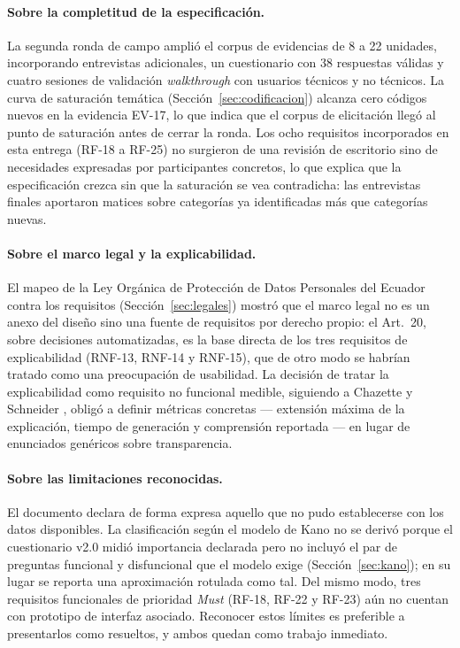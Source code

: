 \documentclass[journal,onecolumn]{IEEEtran}
\begin{document}
	\paragraph{Sobre la completitud de la especificación.}
	La segunda ronda de campo amplió el corpus de evidencias de 8 a 22 unidades,
	incorporando entrevistas adicionales, un cuestionario con 38 respuestas
	válidas y cuatro sesiones de validación \emph{walkthrough} con usuarios
	técnicos y no técnicos. La curva de saturación temática
	(Sección~\ref{sec:codificacion}) alcanza cero códigos nuevos en la evidencia
	EV-17, lo que indica que el corpus de elicitación llegó al punto de
	saturación antes de cerrar la ronda. Los ocho requisitos incorporados en esta
	entrega (RF-18 a RF-25) no surgieron de una revisión de escritorio sino de
	necesidades expresadas por participantes concretos, lo que explica que la
	especificación crezca sin que la saturación se vea contradicha: las
	entrevistas finales aportaron matices sobre categorías ya identificadas más
	que categorías nuevas.
	
	\paragraph{Sobre el marco legal y la explicabilidad.}
	El mapeo de la Ley Orgánica de Protección de Datos Personales del Ecuador
	\cite{lopdp2021} contra los requisitos (Sección~\ref{sec:legales}) mostró que
	el marco legal no es un anexo del diseño sino una fuente de requisitos por
	derecho propio: el Art.~20, sobre decisiones automatizadas, es la base
	directa de los tres requisitos de explicabilidad (RNF-13, RNF-14 y RNF-15),
	que de otro modo se habrían tratado como una preocupación de usabilidad. La
	decisión de tratar la explicabilidad como requisito no funcional medible,
	siguiendo a Chazette y Schneider \cite{chazette2020}, obligó a definir
	métricas concretas --- extensión máxima de la explicación, tiempo de
	generación y comprensión reportada --- en lugar de enunciados genéricos sobre
	transparencia.
	
	\paragraph{Sobre las limitaciones reconocidas.}
	El documento declara de forma expresa aquello que no pudo establecerse con
	los datos disponibles. La clasificación según el modelo de Kano no se derivó
	porque el cuestionario v2.0 midió importancia declarada pero no incluyó el
	par de preguntas funcional y disfuncional que el modelo exige
	(Sección~\ref{sec:kano}); en su lugar se reporta una aproximación rotulada
	como tal. Del mismo modo, tres requisitos funcionales de prioridad
	\emph{Must} (RF-18, RF-22 y RF-23) aún no cuentan con prototipo de interfaz
	asociado. Reconocer estos límites es preferible a presentarlos como
	resueltos, y ambos quedan como trabajo inmediato.
	
\end{document}
